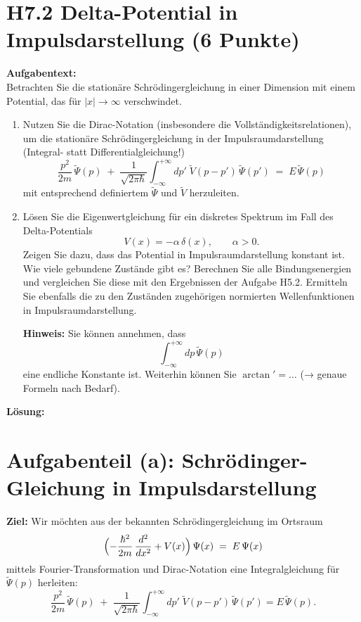\documentclass[12pt,a4paper]{scrartcl}
\begin{document}
\section*{H7.2 Delta-Potential in Impulsdarstellung (6 Punkte)}

\textbf{Aufgabentext:}\\
Betrachten Sie die stationäre Schrödingergleichung in einer Dimension mit einem Potential, das für $|x| \to \infty$ verschwindet.
\begin{enumerate}[label=(\alph*)]
  \item Nutzen Sie die Dirac-Notation (insbesondere die Vollständigkeitsrelationen), um die stationäre Schrödingergleichung in der Impulsraumdarstellung (Integral- statt Differentialgleichung!)
  \[
    \frac{p^2}{2m}\,\widetilde\Psi(p) \;+\; \frac{1}{\sqrt{2\pi\hbar}} \int_{-\infty}^{+\infty} dp'\; \widetilde V(p - p')\,\widetilde\Psi(p') \;=\; E\,\widetilde\Psi(p)
  \]
  mit entsprechend definiertem $\widetilde\Psi$ und $\widetilde V$ herzuleiten.
  \item Lösen Sie die Eigenwertgleichung für ein diskretes Spektrum im Fall des Delta-Potentials 
  \[
    V(x) = - \alpha\,\delta(x), \qquad \alpha > 0.
  \]
  Zeigen Sie dazu, dass das Potential in Impulsraumdarstellung konstant ist. Wie viele gebundene Zustände gibt es? Berechnen Sie alle Bindungsenergien und vergleichen Sie diese mit den Ergebnissen der Aufgabe H5.2. Ermitteln Sie ebenfalls die zu den Zuständen zugehörigen normierten Wellenfunktionen in Impulsraumdarstellung.
  
  \textbf{Hinweis:} Sie können annehmen, dass 
  \[
    \int_{-\infty}^{+\infty} dp\,\widetilde\Psi(p)
  \]
  eine endliche Konstante ist. Weiterhin können Sie $\arctan' = \dots$ (→ genaue Formeln nach Bedarf).
\end{enumerate}

\hrulefill

\bigskip
\textbf{Lösung:}

\section{Aufgabenteil (a): Schrödinger-Gleichung in Impulsdarstellung}

\textbf{Ziel:} Wir möchten aus der bekannten Schrödingergleichung im Ortsraum
\[
  \Bigl(-\frac{\hbar^2}{2m}\,\frac{d^2}{dx^2} + V(x)\Bigr)\,\Psi(x) \;=\; E\,\Psi(x)
\]
mittels Fourier-Transformation und Dirac-Notation eine Integralgleichung für $\widetilde\Psi(p)$ herleiten:
\[
  \frac{p^2}{2m}\,\widetilde\Psi(p) \;+\; \frac{1}{\sqrt{2\pi\hbar}} \int_{-\infty}^{+\infty} dp'\; \widetilde V(p - p')\,\widetilde\Psi(p') = E\,\widetilde\Psi(p).
\]
\end{document}
